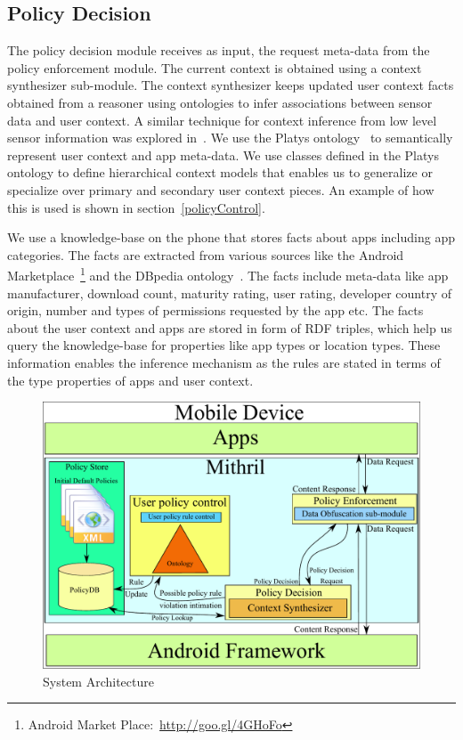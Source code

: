 \subsection{Policy Decision}
\label{poldec}
The policy decision module receives as input, the request meta-data from the policy enforcement module. The current context is obtained using a context synthesizer sub-module. The context synthesizer keeps updated user context facts obtained from a reasoner using ontologies to infer associations between sensor data and user context. A similar technique for context inference from low level sensor information was explored in~\cite{gu2004ontology}. We use the Platys ontology~\cite{Jagtap2011Privacy} to semantically represent user context and app meta-data. We use classes defined in the Platys ontology to define hierarchical context models that enables us to generalize or specialize over primary and secondary user context pieces. An example of how this is used is shown in section~\ref{policyControl}.

We use a knowledge-base on the phone that stores facts about apps including app categories. The facts are extracted from various sources like the Android Marketplace~\footnote{Android Market Place:~\url{http://goo.gl/4GHoFo}} and the DBpedia ontology~\cite{mendes2012dbpedia}. The facts include meta-data like app manufacturer, download count, maturity rating, user rating, developer country of origin, number and types of permissions requested by the app etc. The facts about the user context and apps are stored in form of RDF triples, which help us query the knowledge-base for properties like app types or location types. These information enables the inference mechanism as the rules are stated in terms of the type properties of apps and user context.

\begin{figure}[tb]
	\centering
	\includegraphics[width=\columnwidth]{images/architecture}
	\caption{System Architecture}
	\label{fig:arch}
\end{figure}

